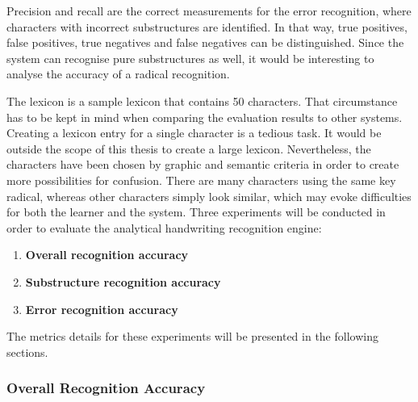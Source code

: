 Precision and recall are the correct measurements for the error recognition,
where characters with incorrect substructures are identified. 
In that way, true positives, false positives, 
true negatives and false negatives can be distinguished.
Since the system can recognise pure substructures as well, it would 
be interesting to analyse the accuracy of a radical recognition.

The lexicon is a sample lexicon that contains 50 characters. That circumstance
has to be kept in mind when comparing the evaluation results to other
systems. Creating a lexicon entry for a single character is a tedious task.
It would be outside the scope of this thesis to create a large lexicon.
Nevertheless, the characters have been chosen by graphic and
semantic criteria in order to create more possibilities for confusion.
There are many characters using the same key radical, whereas other characters
simply look similar, which may evoke difficulties 
for both the learner and the system.
Three experiments will be conducted in order to evaluate the analytical
handwriting recognition engine:
\begin{enumerate}
  \item \textbf{Overall recognition accuracy} \label{eval:enum:overall}
  \item \textbf{Substructure recognition accuracy} \label{eval:enum:substructure}
  \item \textbf{Error recognition accuracy} \label{eval:enum:errorrecognition}
\end{enumerate}
The metrics details for these experiments will be presented in the following 
sections.

\subsubsection{Overall Recognition Accuracy}
\label{sec:eval:overallrecognitionaccuracy}

